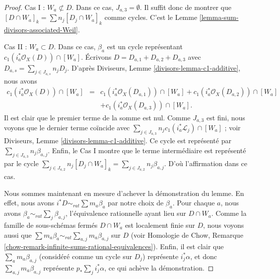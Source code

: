 \begin{proof}
\medskip\noindent
Cas I : $W_a \not \subset D$. Dans ce cas, $J_{a, 3} = \emptyset$.
Il suffit donc de montrer que
$[D \cap W_a]_k = \sum n_j [D_j \cap W_a]_k$ comme cycles.
C'est le Lemme \ref{lemma-sum-divisors-associated-Weil}.

\medskip\noindent
Cas II : $W_a \subset D$. Dans ce cas, $\beta_a$ est un cycle représentant
$c_1(i_a^*\mathcal{O}_X(D)) \cap [W_a]$.
Écrivons $D = D_{a, 1} + D_{a, 2} + D_{a, 3}$ avec
$D_{a, s} = \sum_{j \in J_{a, s}} n_jD_j$.
D'après Diviseurs, Lemme \ref{divisors-lemma-c1-additive}, nous avons
\begin{eqnarray*}
c_1(i_a^*\mathcal{O}_X(D)) \cap [W_a] & = &
c_1(i_a^*\mathcal{O}_X(D_{a, 1})) \cap [W_a] +
c_1(i_a^*\mathcal{O}_X(D_{a, 2})) \cap [W_a] \\
& &
 + c_1(i_a^*\mathcal{O}_X(D_{a, 3})) \cap [W_a].
\end{eqnarray*}
Il est clair que le premier terme de la somme est nul.
Comme $J_{a, 3}$ est fini, nous voyons que le dernier terme coïncide
avec $\sum\nolimits_{j \in J_{a, 3}} n_jc_1(i_a^*\mathcal{L}_j) \cap [W_a]$ ;
voir Diviseurs, Lemme \ref{divisors-lemma-c1-additive}.
Ce cycle est représenté par $\sum_{j \in J_{a, 3}} n_j \beta_{a, j}$.
Enfin, le Cas I montre que le terme intermédiaire est représenté par le cycle
$\sum\nolimits_{j \in J_{a, 2}} n_j[D_j \cap W_a]_k =
\sum_{j \in J_{a, 2}} n_j\beta_{a, j}$.
D'où l'affirmation dans ce cas.

\medskip\noindent
Nous sommes maintenant en mesure d'achever la démonstration du lemme.
En effet, nous avons $i^*D \sim_{rat} \sum m_a\beta_a$ par notre
choix de $\beta_a$. Pour chaque $a$, nous avons
$\beta_a \sim_{rat} \sum_j \beta_{a, j}$, l'équivalence rationnelle
ayant lieu sur $D \cap W_a$.
Comme la famille de sous-schémas fermés $D \cap W_a$
est localement finie sur $D$, nous voyons aussi que
$\sum m_a \beta_a \sim_{rat} \sum_{a, j} m_a\beta_{a, j}$
sur $D$ (voir
Homologie de Chow, Remarque \ref{chow-remark-infinite-sums-rational-equivalences}).
Enfin, il est clair que $\sum_a m_a\beta_{a, j}$ (considéré
comme un cycle sur $D_j$) représente $i_j^*\alpha$, et donc
$\sum_{a, j} m_a\beta_{a, j}$ représente $p_* \sum_j i_j^*\alpha$,
ce qui achève la démonstration.
\end{proof}

